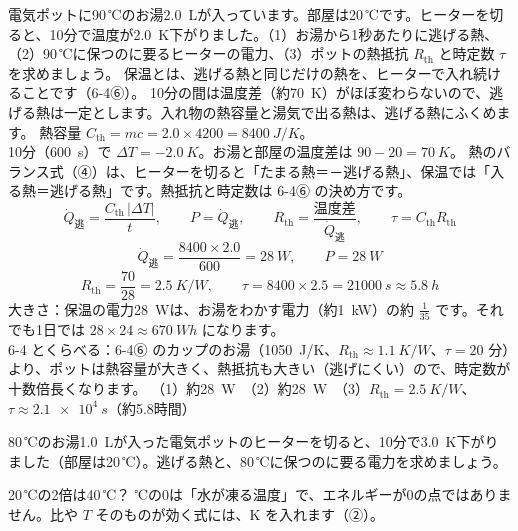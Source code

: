 \label{ph:熱-1:ex12}
\begin{phreidai}[電気ポットの保温に要る電力]
電気ポットに90\,℃のお湯\qty{2.0}{L}が入っています。部屋は20\,℃です。ヒーターを切ると、10分で温度が\qty{2.0}{K}下がりました。（1）お湯から1秒あたりに逃げる熱、（2）90\,℃に保つのに要るヒーターの電力、（3）ポットの熱抵抗 $R_{\mathrm{th}}$ と時定数 $\tau$ を求めましょう。
\phbamen
保温とは、逃げる熱と同じだけの熱を、ヒーターで入れ続けることです（6-4⑥）。
\phmushi
10分の間は温度差（約\qty{70}{K}）がほぼ変わらないので、逃げる熱は一定とします。入れ物の熱容量と湯気で出る熱は、逃げる熱にふくめます。
\phzu
熱容量 $C_{\mathrm{th}}=mc=2.0\times4200=\qty{8400}{J/K}$。\\
10分（\qty{600}{s}）で $\Delta T=-\qty{2.0}{K}$。お湯と部屋の温度差は $90-20=\qty{70}{K}$。
\phriyu
熱のバランス式（④）は、ヒーターを切ると「たまる熱＝－逃げる熱」、保温では「入る熱＝逃げる熱」です。熱抵抗と時定数は 6-4⑥ の決め方です。
\phtateru
\[\dot Q_{\text{逃}}=\frac{C_{\mathrm{th}}\,|\Delta T|}{t},\qquad P=\dot Q_{\text{逃}},\qquad R_{\mathrm{th}}=\frac{\text{温度差}}{\dot Q_{\text{逃}}},\qquad \tau=C_{\mathrm{th}}R_{\mathrm{th}}\]
\phtoku
\[\dot Q_{\text{逃}}=\frac{8400\times2.0}{600}=\qty{28}{W},\qquad P=\qty{28}{W}\]
\[R_{\mathrm{th}}=\frac{70}{28}=\qty{2.5}{K/W},\qquad \tau=8400\times2.5=\qty{21000}{s}\approx\qty{5.8}{h}\]
\phtashikame
大きさ：保温の電力\qty{28}{W}は、お湯をわかす電力（約\qty{1}{kW}）の約 $\tfrac{1}{35}$ です。それでも1日では $28\times24\approx\qty{670}{Wh}$ になります。\\
6-4 とくらべる：6-4⑥ のカップのお湯（\qty{1050}{J/K}、$R_{\mathrm{th}}\approx\qty{1.1}{K/W}$、$\tau=20$ 分）より、ポットは熱容量が大きく、熱抵抗も大きい（逃げにくい）ので、時定数が十数倍長くなります。
\kotae （1）約\qty{28}{W}　（2）約\qty{28}{W}　（3）$R_{\mathrm{th}}=\qty{2.5}{K/W}$、$\tau\approx\qty{2.1e4}{s}$（約5.8時間）
\end{phreidai}
\begin{jibun}
80\,℃のお湯\qty{1.0}{L}が入った電気ポットのヒーターを切ると、10分で\qty{3.0}{K}下がりました（部屋は20\,℃）。逃げる熱と、80\,℃に保つのに要る電力を求めましょう。
\end{jibun}

\begin{tsumazuki}{20\,℃の2倍は40\,℃？}
℃の0は「水が凍る温度」で、エネルギーが0の点ではありません。比や $T$ そのものが効く式には、K を入れます（②）。
\end{tsumazuki}

